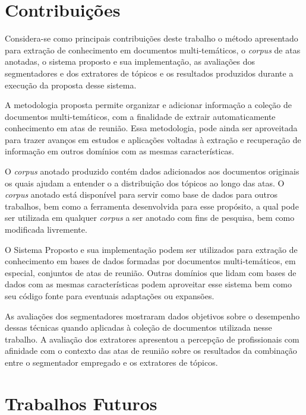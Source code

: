 \section{Contribuições}	



Considera-se como principais contribuições deste trabalho o método apresentado para extração de conhecimento em documentos multi-temáticos, o \textit{corpus} de atas anotadas, o sistema proposto e sua implementação, as avaliações dos segmentadores e dos extratores de tópicos e os resultados produzidos durante a execução da proposta desse sistema. 

A metodologia proposta permite organizar e adicionar informação a coleção de documentos multi-temáticos, com a finalidade de extrair automaticamente conhecimento em atas de reunião. Essa metodologia, pode ainda ser  aproveitada para trazer avanços em estudos e aplicações voltadas à extração e recuperação de informação em outros domínios com as mesmas características. 

O \textit{corpus} anotado produzido contém dados adicionados aos documentos originais os quais ajudam a entender o a distribuição dos tópicos ao longo das atas. O \textit{corpus} anotado está disponível para servir como base de dados para outros trabalhos, bem como a ferramenta desenvolvida para esse propósito, a qual pode ser utilizada em qualquer \textit{corpus} a ser anotado com fins de pesquisa, bem como modificada livremente. 

O Sistema Proposto e sua implementação podem ser utilizados para extração de conhecimento em bases de dados formadas por documentos multi-temáticos, em especial, conjuntos de atas de reunião. Outras domínios que lidam com bases de dados com as mesmas características podem aproveitar esse sistema bem como seu código fonte para eventuais adaptações ou expansões.
 
As avaliações dos segmentadores mostraram dados objetivos sobre o desempenho dessas técnicas quando aplicadas à coleção de documentos utilizada nesse trabalho. 
A avaliação dos extratores apresentou a percepção de profissionais com afinidade com o contexto das atas de reunião sobre os resultados da combinação entre o segmentador empregado e os extratores de tópicos.







\section{Trabalhos Futuros}	

